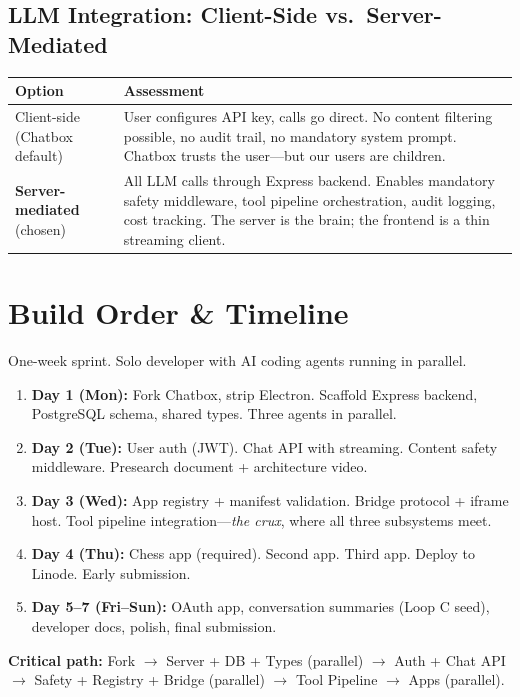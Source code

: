 \documentclass[11pt,letterpaper]{article}
\begin{document}
\subsection*{LLM Integration: Client-Side vs.\ Server-Mediated}

\begin{tabularx}{\textwidth}{l X}
\toprule
\textbf{Option} & \textbf{Assessment} \\
\midrule
Client-side (Chatbox default) & User configures API key, calls go direct. No content filtering possible, no audit trail, no mandatory system prompt. Chatbox trusts the user---but our users are children. \\
\textbf{Server-mediated} {\color{cbgreen}(chosen)} & All LLM calls through Express backend. Enables mandatory safety middleware, tool pipeline orchestration, audit logging, cost tracking. The server is the brain; the frontend is a thin streaming client. \\
\bottomrule
\end{tabularx}

\section*{Build Order \& Timeline}

One-week sprint. Solo developer with AI coding agents running in parallel.

\begin{enumerate}
  \item \textbf{Day 1 (Mon):} Fork Chatbox, strip Electron. Scaffold Express backend, PostgreSQL schema, shared types. Three agents in parallel.
  \item \textbf{Day 2 (Tue):} User auth (JWT). Chat API with streaming. Content safety middleware. Presearch document + architecture video.
  \item \textbf{Day 3 (Wed):} App registry + manifest validation. Bridge protocol + iframe host. Tool pipeline integration---\textit{the crux}, where all three subsystems meet.
  \item \textbf{Day 4 (Thu):} Chess app (required). Second app. Third app. Deploy to Linode. Early submission.
  \item \textbf{Day 5--7 (Fri--Sun):} OAuth app, conversation summaries (Loop C seed), developer docs, polish, final submission.
\end{enumerate}

\noindent\textbf{Critical path:} Fork $\rightarrow$ Server + DB + Types (parallel) $\rightarrow$ Auth + Chat API $\rightarrow$ Safety + Registry + Bridge (parallel) $\rightarrow$ Tool Pipeline $\rightarrow$ Apps (parallel).
\end{document}
